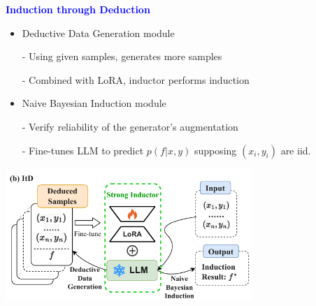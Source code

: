 \documentclass[professionalfont]{beamer}
\begin{document}
\begin{frame}
\begin{center}
    { \textbf{\textcolor{blue}{ {\fontsize{12}{14}\selectfont Induction through Deduction} }} }
\end{center}

{\fontsize{10}{14}\selectfont 
\begin{itemize}
    \item Deductive Data Generation module
    
    - Using given samples, generates more samples
    
    - Combined with LoRA, inductor performs induction
\end{itemize}

\begin{itemize}
    \item Naive Bayesian Induction module
    
    - Verify reliability of the generator's augmentation
    
    - Fine-tunes LLM to predict \(p(f|x,y)\) supposing \((x_{i}, y_{i})\) are iid.
\end{itemize}
}

\begin{center}
    \includegraphics[width=0.7\textwidth]{figure2-2.png}
\end{center}

\end{frame}
\end{document}
